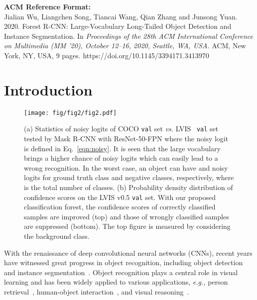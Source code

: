 \documentclass[sigconf]{acmart}
\begin{document}




\maketitle
{\fontsize{8pt}{8pt}\selectfont
	\textbf{ACM Reference Format:}\\
	Jialian Wu, Liangchen Song, Tiancai Wang, Qian Zhang and Junsong Yuan. 2020. Forest R-CNN: Large-Vocabulary Long-Tailed Object Detection and Instance Segmentation. In \textit{Proceedings of the 28th ACM International Conference on Multimedia (MM '20), October 12--16, 2020, Seattle, WA, USA.} ACM, New York, NY, USA, 9 pages. https://doi.org/10.1145/3394171.3413970}

\section{Introduction}

\begin{figure}
	\centering
	\texttt{[image: fig/fig2/fig2.pdf]}
	\vspace{-7mm}
	\caption{(a) Statistics of noisy logits of COCO \texttt{val} set \emph{vs.} LVIS~\cite{lvis} \texttt{val} set tested by Mask R-CNN with ResNet-50-FPN where the noisy logit is defined in Eq.~\ref{eqn:noisy}. It is seen that the large vocabulary brings a higher chance of noisy logits which can easily lead to a wrong recognition. In the worst case, an object can have  and  noisy logits for ground truth class and negative classes, respectively, where  is the total number of classes. (b) Probability density distribution of confidence scores on the LVIS v0.5 \texttt{val} set. With our proposed classification forest, the confidence scores of correctly classified samples are improved (top) and those of wrongly classified samples are suppressed (bottom). The top figure is measured by considering the background class.}
	\label{fig:fig1}
	\vspace{-3mm}
\end{figure}

With the renaissance of deep convolutional neural networks (CNNs), recent years have witnessed great progress in object recognition, including object detection~\cite{rcnn,faster_rcnn,snip,ssd,li_cvpr20,pang_tcb16} and instance segmentation~\cite{maskrcnn,mask_score,yolact,dai_eccv16,xu_iccv19}. Object recognition plays a central role in visual learning and has been widely applied to various applications, \emph{e.g.,} person retrieval~\cite{xiao_cvpr18}, human-object interaction~\cite{tiancai_cvpr20}, and visual reasoning~\cite{jiajun_nips17}.
\end{document}
